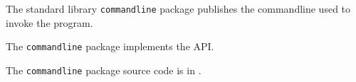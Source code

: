 
The standard library {\tt commandline} package publishes the commandline used to invoke the program.

The {\tt commandline} package implements the  API.

The {\tt commandline} package source code is in .



